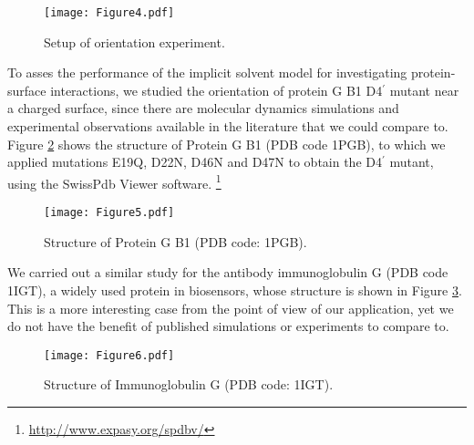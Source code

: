 \begin{figure}%
   \centering
   \texttt{[image: Figure4.pdf]}
   \caption{Setup of orientation experiment.}
   \label{fig:1pgb_orientation}
\end{figure}

To asses the performance of the implicit solvent model for investigating protein-surface interactions, we studied the orientation of protein G B1 D4$^\prime$ mutant near a charged surface, since there are molecular dynamics simulations \cite{LiuLiaoZhou2013} and experimental observations \cite{BaioWeidnerBaughGambleStaytonCastner2012} available in the literature that we could compare to. Figure \ref{fig:1pgb} shows the structure of Protein G B1 (PDB code 1PGB), to which we applied mutations E19Q, D22N, D46N and D47N to obtain the D4$^\prime$ mutant, using the SwissPdb Viewer software. \cite{GuexPeitsch1997} \footnote{\url{http://www.expasy.org/spdbv/}}

\begin{figure}%
   \centering
   \texttt{[image: Figure5.pdf]}
   \caption{Structure of Protein G B1 (PDB code: 1PGB).}
   \label{fig:1pgb}
\end{figure}

We carried out a similar study for the antibody immunoglobulin G (PDB code 1IGT), a widely used protein in biosensors, whose structure is shown in Figure \ref{fig:1igt}. This is a more interesting case from the point of view of our application, yet we do not have the benefit of published simulations or experiments to compare to.

\begin{figure}%
   \centering
   \texttt{[image: Figure6.pdf]}
   \caption{Structure of Immunoglobulin G (PDB code: 1IGT).}
   \label{fig:1igt}
\end{figure}

